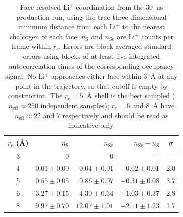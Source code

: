 \begin{table}[htbp]
\caption{Face-resolved Li$^+$ coordination from the 30~ns production run,
using the true three-dimensional minimum distance from each Li$^+$ to the
nearest chalcogen of each face. $n_{\mathrm{S}}$ and $n_{\mathrm{Se}}$ are
Li$^+$ counts per frame within $r_c$. Errors are block-averaged standard
errors using blocks of at least five integrated autocorrelation times of
the corresponding occupancy signal. No Li$^+$ approaches either face
within 3~\AA{} at any point in the trajectory, so that cutoff is empty by
construction. The $r_c = 5$~\AA{} shell is the best sampled
($n_{\mathrm{eff}} \approx 250$ independent samples); $r_c = 6$ and
8~\AA{} have $n_{\mathrm{eff}} \approx 22$ and $7$ respectively and
should be read as indicative only.}
\label{tab:contacts}
\centering
\begin{tabular}{crrrc}
\hline
$r_c$ (\AA) & $n_{\mathrm{S}}$ & $n_{\mathrm{Se}}$ & $n_{\mathrm{Se}}-n_{\mathrm{S}}$ & $\sigma$ \\
\hline
3 & 0 & 0 & --- & --- \\
4 & $0.01 \pm 0.00$ & $0.04 \pm 0.01$ & $+0.02 \pm 0.01$ & 2.0 \\
5 & $0.55 \pm 0.05$ & $0.86 \pm 0.07$ & $+0.31 \pm 0.08$ & 3.7 \\
6 & $3.27 \pm 0.15$ & $4.30 \pm 0.34$ & $+1.03 \pm 0.37$ & 2.8 \\
8 & $9.97 \pm 0.70$ & $12.07 \pm 1.01$ & $+2.11 \pm 1.23$ & 1.7 \\
\hline
\end{tabular}
\end{table}

